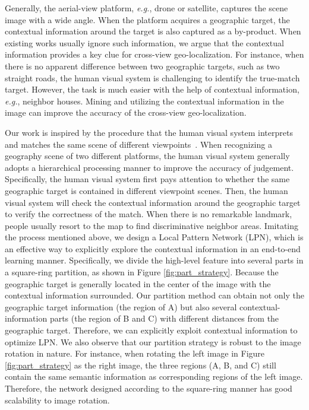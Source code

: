 \documentclass[journal]{IEEEtran}
\def\eg{\emph{e.g.}}
\begin{document}
Generally, the aerial-view platform, \eg, drone or satellite, captures the scene image with a wide angle. When the platform acquires a geographic target, the contextual information around the target is also captured as a by-product. 
When existing works usually ignore such information, we argue that the contextual information provides a key clue for cross-view geo-localization. For instance, when there is no apparent difference between two geographic targets, such as two straight roads, the human visual system is challenging to identify the true-match target. However, the task is much easier with the help of contextual information, \eg, neighbor houses. Mining and utilizing the contextual information in the image can improve the accuracy of the cross-view geo-localization.  
\par
Our work is inspired by the procedure that the human visual system interprets and matches the same scene of different viewpoints~\cite{rensink2000dynamic,corbetta2002control,zheng2020vehiclenet}.
When recognizing a geography scene of two different platforms, the human visual system generally adopts a hierarchical processing manner to improve the accuracy of judgement. Specifically, the human visual system first pays attention to whether the same geographic target is contained in different viewpoint scenes. Then, the human visual system will check the contextual information around the geographic target to verify the correctness of the match. When there is no remarkable landmark, people usually resort to the map to find discriminative neighbor areas. Imitating the process mentioned above, we design a Local Pattern Network (LPN), which is an effective way to explicitly explore the contextual information in an end-to-end learning manner. Specifically, we divide the high-level feature into several parts in a square-ring partition, as shown in Figure \ref{fig:part_strategy}. Because the geographic target is generally located in the center of the image with the contextual information surrounded. Our partition method can obtain not only the geographic target information (the region of A) but also several contextual-information parts (the region of B and C) with different distances from the geographic target. Therefore, we can explicitly exploit contextual information to optimize LPN. We also observe that our partition strategy is robust to the image rotation in nature. For instance, when rotating the left image in Figure \ref{fig:part_strategy} as the right image, the three regions (A, B, and C) still contain the same semantic information as corresponding regions of the left image. Therefore, the network designed according to the square-ring manner has good scalability to image rotation.
\end{document}
